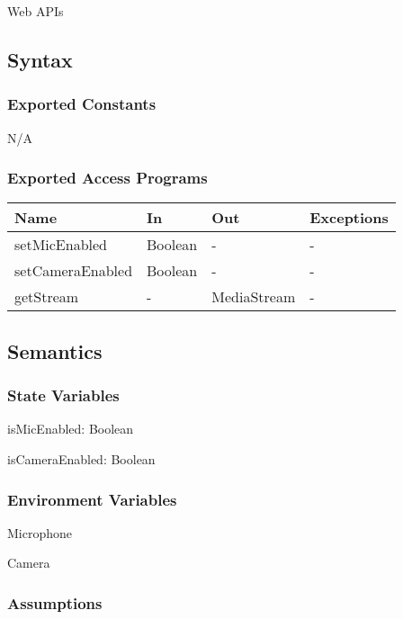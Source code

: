 \documentclass[12pt, titlepage]{article}
\begin{document}
\noindent Web APIs

\subsection{Syntax}

\subsubsection{Exported Constants}

N/A

\subsubsection{Exported Access Programs}

\begin{center}
  \begin{tabular}{p{4cm} p{4cm} p{4cm} p{2cm}}
    \hline
    \textbf{Name}          & \textbf{In}   & \textbf{Out}      & \textbf{Exceptions} \\
    \hline
    setMicEnabled    & Boolean & -           & -             \\
    setCameraEnabled & Boolean & -           & -             \\
    getStream        & -       & MediaStream & -             \\
    \hline
  \end{tabular}
\end{center}

\subsection{Semantics}

\subsubsection{State Variables}

\noindent isMicEnabled: Boolean

\noindent isCameraEnabled: Boolean

\subsubsection{Environment Variables}

\noindent Microphone

\noindent Camera

\subsubsection{Assumptions}
\end{document}
